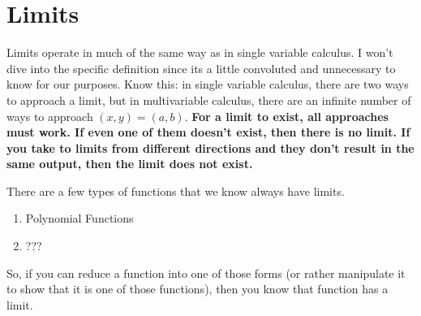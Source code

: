 \section{Limits}

Limits operate in much of the same way as in single variable calculus. I won't dive into the specific definition since its a little convoluted and
unnecessary to know for our purposes. Know this: in single variable calculus, there are two ways to approach a limit, but in multivariable calculus,
there are an infinite number of ways to approach $(x,y) = (a,b)$. \textbf{For a limit to exist, all approaches must work. If even one of them doesn't
exist, then there is no limit. If you take to limits from different directions and they don't result in the same output, then the limit does not exist.}

There are a few types of functions that we know always have limits.
\begin{enumerate}
    \item Polynomial Functions
    \item ???
\end{enumerate}

So, if you can reduce a function into one of those forms (or rather manipulate it to show that it is one of those functions), then you know 
that function has a limit.